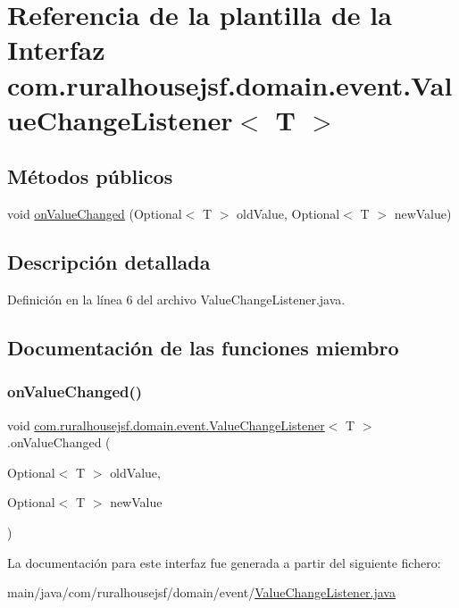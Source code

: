 \hypertarget{a00176}{}\section{Referencia de la plantilla de la Interfaz com.\+ruralhousejsf.\+domain.\+event.\+Value\+Change\+Listener$<$ T $>$}
\label{a00176}
\subsection*{Métodos públicos}
\begin{DoxyCompactItemize}
\item 
void \mbox{\hyperlink{a00176_a415b70f14683821f1674cd6bb1293904}{on\+Value\+Changed}} (Optional$<$ T $>$ old\+Value, Optional$<$ T $>$ new\+Value)
\end{DoxyCompactItemize}


\subsection{Descripción detallada}


Definición en la línea 6 del archivo Value\+Change\+Listener.\+java.



\subsection{Documentación de las funciones miembro}
\mbox{\label{a00176_a415b70f14683821f1674cd6bb1293904}} 
\subsubsection{\texorpdfstring{onValueChanged()}{onValueChanged()}}
{\footnotesize\ttfamily void \mbox{\hyperlink{a00176}{com.\+ruralhousejsf.\+domain.\+event.\+Value\+Change\+Listener}}$<$ T $>$.on\+Value\+Changed (\begin{DoxyParamCaption}\item[{Optional$<$ T $>$}]{old\+Value,  }\item[{Optional$<$ T $>$}]{new\+Value }\end{DoxyParamCaption})}



La documentación para este interfaz fue generada a partir del siguiente fichero\+:\begin{DoxyCompactItemize}
\item 
main/java/com/ruralhousejsf/domain/event/\mbox{\hyperlink{a00038}{Value\+Change\+Listener.\+java}}\end{DoxyCompactItemize}
